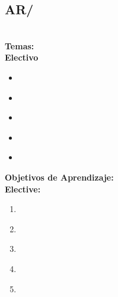 \subsection{AR/\ARMultiprocessingandalternativearchitectures}\label{sec:BOK:ARMultiprocessingandalternativearchitectures}
\ARMultiprocessingandalternativearchitecturesDescription\\
\noindent \textbf{Temas:}\\
\noindent \textbf{Electivo}
\begin{itemize}
	\item \ARMultiprocessingandalternativearchitecturesTopicPower\label{sec:BOK:ARMultiprocessingandalternativearchitecturesTopicPower}
	\item \ARMultiprocessingandalternativearchitecturesTopicExample\label{sec:BOK:ARMultiprocessingandalternativearchitecturesTopicExample}
	\item \ARMultiprocessingandalternativearchitecturesTopicInterconnection\label{sec:BOK:ARMultiprocessingandalternativearchitecturesTopicInterconnection}
	\item \ARMultiprocessingandalternativearchitecturesTopicShared\label{sec:BOK:ARMultiprocessingandalternativearchitecturesTopicShared}
	\item \ARMultiprocessingandalternativearchitecturesTopicMultiprocessor\label{sec:BOK:ARMultiprocessingandalternativearchitecturesTopicMultiprocessor}
\end{itemize}


\noindent \textbf{Objetivos de Aprendizaje:}\\
\noindent \textbf{Elective:}
\begin{enumerate}
	\setcounter{enumi}{0}
	\item \ARMultiprocessingandalternativearchitecturesLODiscussTheParallel\xspace[\ARMultiprocessingandalternativearchitecturesLODiscussTheParallelLevel]\label{sec:BOK:ARMultiprocessingandalternativearchitecturesLODiscussTheParallel}
	\item \ARMultiprocessingandalternativearchitecturesLODescribeAlternative\xspace[\ARMultiprocessingandalternativearchitecturesLODescribeAlternativeLevel]\label{sec:BOK:ARMultiprocessingandalternativearchitecturesLODescribeAlternative}
	\item \ARMultiprocessingandalternativearchitecturesLOExplainTheInterconnection\xspace[\ARMultiprocessingandalternativearchitecturesLOExplainTheInterconnectionLevel]\label{sec:BOK:ARMultiprocessingandalternativearchitecturesLOExplainTheInterconnection}
	\item \ARMultiprocessingandalternativearchitecturesLODiscussTheThat\xspace[\ARMultiprocessingandalternativearchitecturesLODiscussTheThatLevel]\label{sec:BOK:ARMultiprocessingandalternativearchitecturesLODiscussTheThat}
	\item \ARMultiprocessingandalternativearchitecturesLODescribeTheMemoryMemory\xspace[\ARMultiprocessingandalternativearchitecturesLODescribeTheMemoryMemoryLevel]\label{sec:BOK:ARMultiprocessingandalternativearchitecturesLODescribeTheMemoryMemory}
\end{enumerate}


